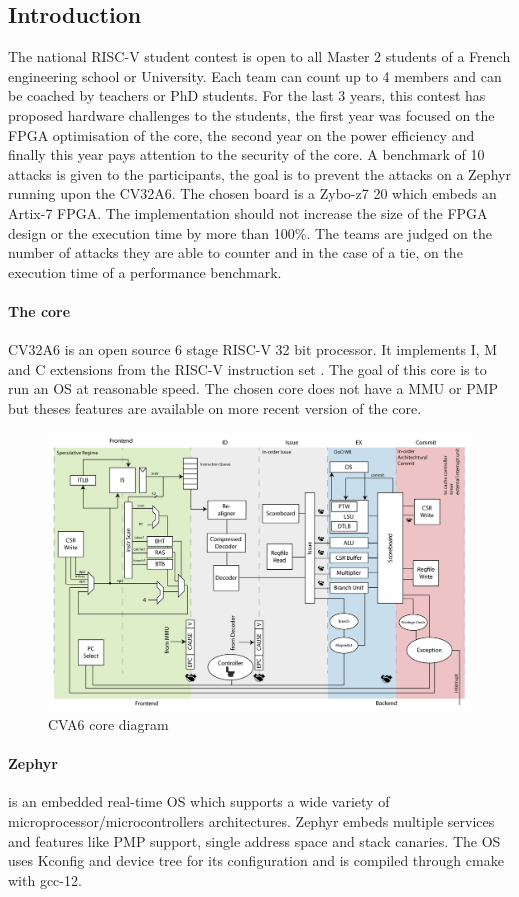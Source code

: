 \documentclass[9pt]{article}
\begin{document}
\begin{multicols}{2}

\section{Introduction}
The national RISC-V student contest is open to all Master 2 students of a French engineering school or University. 
Each team can count up to 4 members and can be coached by teachers or PhD students. 
For the last 3 years, this contest has proposed hardware challenges to the students, the first year was focused on the FPGA optimisation of the core, the second year on the power efficiency and finally this year pays attention to the security of the core. 
A benchmark of 10 attacks is given to the participants, the goal is to prevent the attacks on a Zephyr running upon the CV32A6. 
The chosen board is a Zybo-z7 20 which embeds an Artix-7 FPGA. 
The implementation should not increase the size of the FPGA design or the execution time by more than 100\%. 
The teams are judged on the number of attacks they are able to counter and in the case of a tie, on the execution time of a performance benchmark.




\paragraph{The core} CV32A6 is an open source 6 stage RISC-V 32 bit processor. It implements I, M and C extensions from the RISC-V instruction set \cite{riscv_isa}. The goal of this core is to run an OS at reasonable speed. The chosen core does not have a MMU or PMP but theses features are available on more recent version of the core. 

\begin{figure}[H]
    \centering
    \includegraphics[width=0.4\linewidth]{img/core_diagram.png}
    \caption{CVA6 core diagram \cite{cva6_doc}}
    \label{fig:core_diag}
\end{figure}

\paragraph{Zephyr} is an embedded real-time OS which supports a wide variety of microprocessor/microcontrollers architectures.
Zephyr embeds multiple services and features like PMP support, single address space and stack canaries. 
The OS uses Kconfig and device tree for its configuration and is compiled through cmake with gcc-12.   


\end{multicols}
\end{document}
